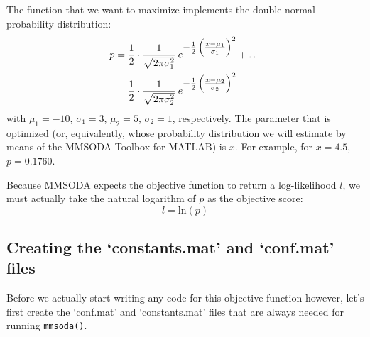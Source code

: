 
The function that we want to maximize implements the double-normal probability distribution:
\begin{equation}\label{eq:double-normal}
\begin{align}
p = \frac{1}{2}\cdot{}\frac{1}{\sqrt{2\pi\sigma_1^2}}\:e^\mathlarger{-\frac{1}{2}\left(\frac{x-\mu_1}{\sigma_1}\right)^2} & +\dots \\
    \frac{1}{2}\cdot{}\frac{1}{\sqrt{2\pi\sigma_2^2}}\:e^\mathlarger{-\frac{1}{2}\left(\frac{x-\mu_2}{\sigma_2}\right)^2} & \\
\end{align}
\end{equation}
with $\mu_1 = -10$, $\sigma_1 = 3$, $\mu_2 = 5$, $\sigma_2 = 1$, respectively. The parameter that is optimized (or, equivalently, whose probability distribution we will estimate by means of the MMSODA Toolbox for MATLAB) is $x$. For example, for $x=4.5$, $p = 0.1760$.


Because MMSODA expects the objective function to return a log-likelihood $l$, we must actually take the natural logarithm of $p$ as the objective score:
\begin{equation}\label{eq:log-likelihood}
l=\mathrm{ln}\left(p\right)
\end{equation}

\subsection{Creating the `constants.mat' and `conf.mat' files}

Before we actually start writing any code for this objective function however, let's first create the `conf.mat' and `constants.mat' files that are always needed for running \texttt{mmsoda()}.



